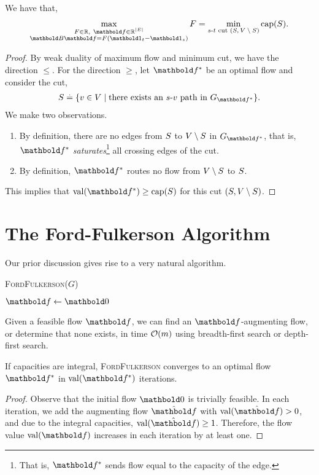 \begin{thm}
We have that, \begin{align}
    \max_{\substack{F \in \R,\ \vf \in \R^{|\sE|} \\ \mB\vf = F(\vOne_t - \vOne_s)}} F = \min_{\text{$s$-$t$ cut $(\sS, \sV \setminus \sS)$}} \capa(\sS).
\end{align}
\end{thm}
\begin{proof}
By weak duality of maximum flow and minimum cut, we have the direction $\leq$. For the direction $\geq$, let $\s{\vf}$ be an optimal flow and consider the cut, \begin{align*}
    \sS \defeq \{v \in \sV \mid \text{there exists an $s$-$v$ path in $G_{\s{\vf}}$}\}.
\end{align*} We make two observations. \begin{enumerate}
    \item By definition, there are no edges from $S$ to $V \setminus S$ in $G_{\s{\vf}}$, that is, $\s{\vf}$ \emph{saturates}\footnote{That is, $\s{\vf}$ sends flow equal to the capacity of the edge.} all crossing edges of the cut.
    \item By definition, $\s{\vf}$ routes no flow from $V \setminus S$ to $S$.
\end{enumerate}\noindent This implies that $\val(\s{\vf}) \geq \capa(\sS)$ for this cut $(S, V \setminus S)$.
\end{proof}

\section{The Ford-Fulkerson Algorithm}

Our prior discussion gives rise to a very natural algorithm.

\begin{algorithm}
    \caption{\textsc{FordFulkerson($G$)}}
    $\vf \gets \vZero$\;
    \Return{$\vf$}
\end{algorithm}

Given a feasible flow $\vf$, we can find an $\vf$-augmenting flow, or determine that none exists, in time $\LandauO{m}$ using breadth-first search or depth-first search.

\begin{thm}
If capacities are integral, \textsc{FordFulkerson} converges to an optimal flow $\s{\vf}$ in $\val(\s{\vf})$ iterations.
\end{thm}
\begin{proof}
Observe that the initial flow $\vZero$ is trivially feasible. In each iteration, we add the augmenting flow $\hat{\vf}$ with $\val(\hat{\vf}) > 0$, and due to the integral capacities, $\val(\hat{\vf}) \geq 1$. Therefore, the flow value $\val(\vf)$ increases in each iteration by at least one.
\end{proof}

